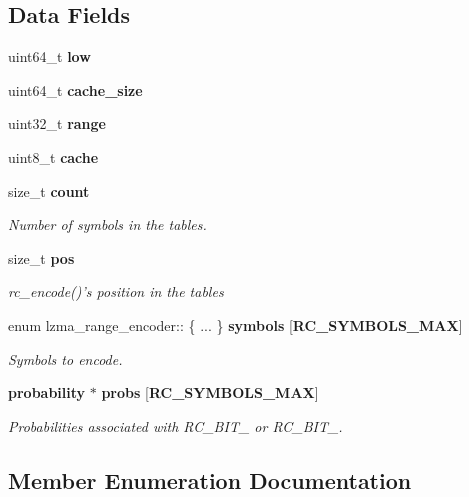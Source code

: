 \subsection*{Data Fields}
\begin{DoxyCompactItemize}
\item 
uint64\-\_\-t {\bfseries low}\label{structlzma__range__encoder_aea514237688256472a39826ec6a39bec}

\item 
uint64\-\_\-t {\bfseries cache\-\_\-size}\label{structlzma__range__encoder_a2e3ea76f8de7eae04ef9f217458e2e16}

\item 
uint32\-\_\-t {\bfseries range}\label{structlzma__range__encoder_aeb5047cba8d9006ed10e5dd3700351c4}

\item 
uint8\-\_\-t {\bfseries cache}\label{structlzma__range__encoder_ac4ef8e2923b343ded1c3a1a829fc5260}

\item 
size\-\_\-t {\bf count}
\begin{DoxyCompactList}\small\item\em Number of symbols in the tables. \end{DoxyCompactList}\item 
size\-\_\-t {\bf pos}
\begin{DoxyCompactList}\small\item\em rc\-\_\-encode()'s position in the tables \end{DoxyCompactList}\item 
enum lzma\-\_\-range\-\_\-encoder\-:: \{ ... \}  {\bf symbols} [{\bf R\-C\-\_\-\-S\-Y\-M\-B\-O\-L\-S\-\_\-\-M\-A\-X}]
\begin{DoxyCompactList}\small\item\em Symbols to encode. \end{DoxyCompactList}\item 
{\bf probability} $\ast$ {\bf probs} [{\bf R\-C\-\_\-\-S\-Y\-M\-B\-O\-L\-S\-\_\-\-M\-A\-X}]
\begin{DoxyCompactList}\small\item\em Probabilities associated with R\-C\-\_\-\-B\-I\-T\-\_ or R\-C\-\_\-\-B\-I\-T\-\_. \end{DoxyCompactList}\end{DoxyCompactItemize}


\subsection{Member Enumeration Documentation}
